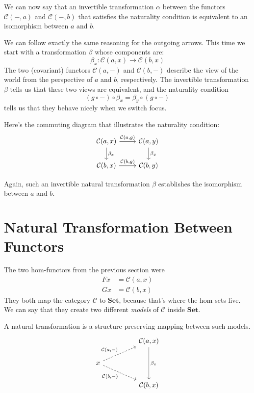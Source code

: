 \documentclass[DaoFP]{subfiles}
\begin{document}
We can now say that  an invertible transformation $\alpha$ between the functors $\mathcal{C}(-, a)$ and $\mathcal{C}(-, b)$ that satisfies the naturality condition is equivalent to an isomorphism between $a$ and $b$.

We can follow exactly the same reasoning for the outgoing arrows. This time we start with a transformation $\beta$ whose components are:
\[ \beta_x \colon \mathcal{C}(a, x) \to \mathcal{C}(b, x) \]
The two (covariant) functors $\mathcal{C}(a, -)$ and $\mathcal{C}(b, -)$ describe the view of the world from the perspective of $a$ and $b$, respectively. The invertible transformation $\beta$ tells us that these two views are equivalent, and the naturality condition 
\[ (g \circ -) \circ \beta_x = \beta_y \circ (g \circ -) \]
tells us that they behave nicely when we switch focus.

Here's the commuting diagram that illustrates the naturality condition:
\[
 \begin{tikzcd}
 \mathcal{C}(a, x)
 \arrow[d, "\beta_x"]
 \arrow[r, "{\mathcal{C}(a, g)}"]
 &
 \mathcal{C}(a, y)
  \arrow[d, "\beta_y"]
 \\
 \mathcal{C}(b, x)
 \arrow[r, "{\mathcal{C}(b, g)}"]
& \mathcal{C}(b, y)
 \end{tikzcd}
\]

Again, such an invertible natural transformation $\beta$ establishes the isomorphism between $a$ and $b$.

\section{Natural Transformation Between Functors}

The two hom-functors from the previous section were
\begin{align*}
 F x &=   \mathcal{C}(a, x) \\
G x &=   \mathcal{C}(b, x)
\end{align*}
They both map the category $\mathcal{C}$ to  $\mathbf{Set}$, because that's where the hom-sets live. We can say that they create two different \emph{models} of $\mathcal{C}$ inside $\mathbf{Set}$. 

A natural transformation is a structure-preserving mapping between such models. 
\[
 \begin{tikzcd}
 && \cat C(a, x)
 \arrow[dd, "\beta_x"]
 \\
 x
 \arrow[rru, dashed, "{\cat C(a, -)}"]
 \arrow[rrd, dashed, "{\cat C(b, -)}"']
 \\
 && \cat C(b, x)
 \end{tikzcd}
\]
\end{document}

